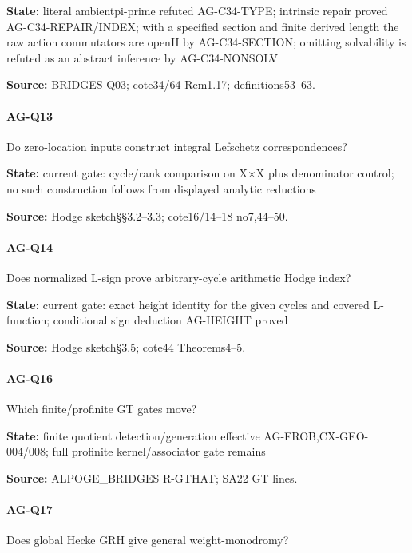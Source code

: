 \documentclass[11pt,a4paper]{article}
\begin{document}
\textbf{State:} literal ambientpi-prime refuted AG-C34-TYPE; intrinsic repair proved AG-C34-REPAIR/\allowbreak{}INDEX; with a specified section and finite derived length the raw action commutators are openH by AG-C34-SECTION; omitting solvability is refuted as an abstract inference by AG-C34-NONSOLV

\textbf{Source:} BRIDGES Q03; cote34/\allowbreak{}64 Rem1.\allowbreak{}17; definitions53–\allowbreak{}63.

\paragraph{AG-Q13} Do zero-location inputs construct integral Lefschetz correspondences?

\textbf{State:} current gate:\allowbreak{} cycle/\allowbreak{}rank comparison on X×X plus denominator control; no such construction follows from displayed analytic reductions

\textbf{Source:} Hodge sketch§§3.\allowbreak{}2–\allowbreak{}3.\allowbreak{}3; cote16/\allowbreak{}14–\allowbreak{}18 no7,44–\allowbreak{}50.

\paragraph{AG-Q14} Does normalized L-sign prove arbitrary-cycle arithmetic Hodge index?

\textbf{State:} current gate:\allowbreak{} exact height identity for the given cycles and covered L-function; conditional sign deduction AG-HEIGHT proved

\textbf{Source:} Hodge sketch§3.\allowbreak{}5; cote44 Theorems4–\allowbreak{}5.

\paragraph{AG-Q16} Which finite/\allowbreak{}profinite GT gates move?

\textbf{State:} finite quotient detection/\allowbreak{}generation effective AG-FROB,CX-GEO-004/\allowbreak{}008; full profinite kernel/\allowbreak{}associator gate remains

\textbf{Source:} ALPOGE\_\allowbreak{}BRIDGES R-GTHAT; SA22 GT lines.

\paragraph{AG-Q17} Does global Hecke GRH give general weight-monodromy?
\end{document}
